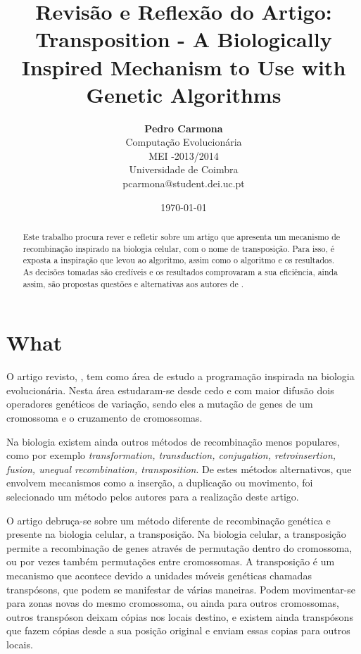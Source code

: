 \documentclass[11pt,portuguese,a4paper]{article}
\title{\LARGE{\textbf{Revisão e Reflexão do Artigo:}}\\ Transposition - A Biologically Inspired Mechanism to Use with Genetic Algorithms \cite{Simoes99transposition:a}}
\author{ \textbf{Pedro Carmona} \\ Computação Evolucionária\\ MEI -2013/2014 \\ Universidade de Coimbra \\ pcarmona@student.dei.uc.pt}
\date{\today}
\begin{document}
\maketitle

\begin{abstract}
Este trabalho procura rever e refletir sobre um artigo que apresenta um mecanismo de recombinação inspirado na biologia celular, com o nome de transposição. Para isso, é exposta a inspiração que levou ao algoritmo, assim como o algoritmo e os resultados. As decisões tomadas são credíveis e os resultados comprovaram a sua eficiência, ainda assim, são propostas questões e alternativas aos autores de \cite{Simoes99transposition:a}.
\end{abstract}

\section{What}


O artigo revisto, \cite{Simoes99transposition:a}, tem como área de estudo a programação inspirada na biologia evolucionária.
Nesta área estudaram-se desde cedo e com maior difusão dois operadores genéticos de variação, sendo eles a mutação de genes de um cromossoma e o cruzamento de cromossomas.

Na biologia existem ainda outros métodos de recombinação menos populares, como por exemplo \textit{transformation, transduction, conjugation, retroinsertion, fusion, unequal recombination, transposition}\cite{Simoes99transposition:a}. De estes métodos alternativos, que envolvem mecanismos como a inserção, a duplicação ou movimento, foi selecionado um método pelos autores para a realização deste artigo.

O artigo debruça-se sobre um método diferente de recombinação genética e presente na biologia celular, a transposição.
Na biologia celular, a transposição permite a recombinação de genes através de permutação dentro do cromossoma, ou por vezes também permutações entre cromossomas.
A transposição é um mecanismo que acontece devido a unidades móveis genéticas chamadas transpósons, que podem se manifestar de várias maneiras. Podem movimentar-se para zonas novas do mesmo cromossoma, ou ainda para outros cromossomas, outros transpóson deixam cópias nos locais destino, e existem ainda transpósons que fazem cópias desde a sua posição original e enviam essas copias para outros locais.
\end{document}
